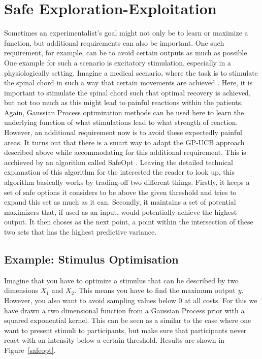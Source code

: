 \documentclass[authoryear,11pt,review]{elsarticle}
\begin{document}
\section{Safe Exploration-Exploitation}
Sometimes an experimentalist's goal might not only be to learn or maximize a function, but additional requirements can also be important. One such requirement, for example, can be to avoid certain outputs as much as possible. One example for such a scenario is excitatory stimulation, especially in a physiologically setting. Imagine a medical scenario, where the task is to stimulate the spinal chord in such a way that certain movements are achieved \citep{desautels2014spinal}. Here, it is important to stimulate the spinal chord such that optimal recovery is achieved, but not too much as this might lead to painful reactions within the patients. Again, Gaussian Process optimization methods can be used here to learn the underlying function of what stimulations lead to what strength of reaction. However, an additional requirement now is to avoid these expectedly painful areas. It turns out that there is a smart way to adapt the GP-UCB approach described above while accommodating for this additional requirement. This is acchieved by an algorithm called SafeOpt \citep{sui2015safe}. Leaving the detailed technical explanation of this algorithm for the interested the reader to look up, this algorithm basically works by trading-off two different things. Firstly, it keeps a set of safe options it considers to be above the given threshold and tries to expand this set as much as it can. Secondly, it maintains a set of potential maximizers that, if used as an input, would potentially achieve the highest output. It then choses as the next point, a point within the intersection of these two sets that has the highest predictive variance.

\subsection{Example: Stimulus Optimisation}
Imagine that you have to optimize a stimulus that can be described by two dimensions $X_1$ and $X_2$. This means you have to find the maximum output $y$. However, you also want to avoid sampling values below 0 at all costs. For this we have drawn a two dimensional function from a Gaussian Process prior with a squared exponential kernel. This can be seen as a similar to the case where one want to present stimuli to participants, but make sure that participants never react with an intensity below a certain threshold. Results are shown in Figure~\ref{safeopt}.
\end{document}
